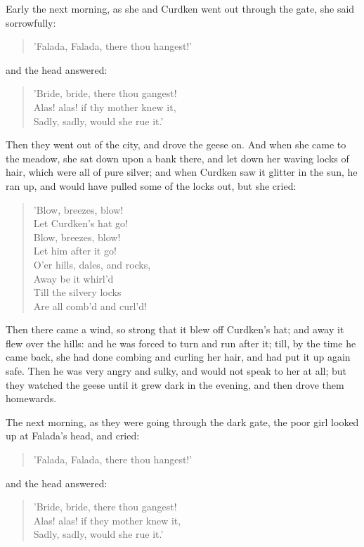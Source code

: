 \documentclass[12pt]{book}
\begin{document}
Early the next morning, as she and Curdken went out through the gate,
she said sorrowfully:

\begin{verse}
 'Falada, Falada, there thou hangest!'
\end{verse}

and the head answered:

\begin{verse}
 'Bride, bride, there thou gangest!\\
  Alas! alas! if thy mother knew it,\\
  Sadly, sadly, would she rue it.'
\end{verse}

Then they went out of the city, and drove the geese on. And when she
came to the meadow, she sat down upon a bank there, and let down her
waving locks of hair, which were all of pure silver; and when Curdken
saw it glitter in the sun, he ran up, and would have pulled some of
the locks out, but she cried:

\begin{verse}
 'Blow, breezes, blow!\\
  Let Curdken's hat go!\\
  Blow, breezes, blow!\\
  Let him after it go!\\
  O'er hills, dales, and rocks,\\
  Away be it whirl'd\\
  Till the silvery locks\\
  Are all comb'd and curl'd!
\end{verse}

Then there came a wind, so strong that it blew off Curdken's hat; and
away it flew over the hills: and he was forced to turn and run after
it; till, by the time he came back, she had done combing and curling
her hair, and had put it up again safe. Then he was very angry and
sulky, and would not speak to her at all; but they watched the geese
until it grew dark in the evening, and then drove them homewards.

The next morning, as they were going through the dark gate, the poor
girl looked up at Falada's head, and cried:

\begin{verse}
 'Falada, Falada, there thou hangest!'
\end{verse}

and the head answered:

\begin{verse}
 'Bride, bride, there thou gangest!\\
  Alas! alas! if they mother knew it,\\
  Sadly, sadly, would she rue it.'
\end{verse}
\end{document}
